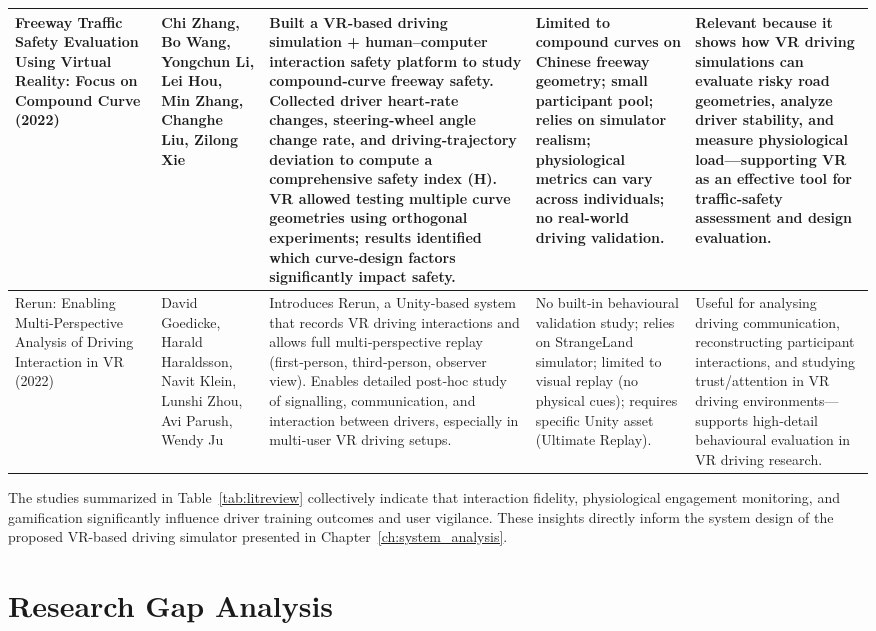 {\begin{longtable}{|p{}|p{}|>{\raggedright\arraybackslash}p{}|>{\raggedright\arraybackslash}p{}|>{\raggedright\arraybackslash}p{}|}
Freeway Traffic Safety Evaluation Using Virtual Reality: Focus on Compound Curve (2022)~\cite{Zhang2022} & Chi Zhang, Bo Wang, Yongchun Li, Lei Hou, Min Zhang, Changhe Liu, Zilong Xie & Built a VR‑based driving simulation + human–computer interaction safety platform to study compound‑curve freeway safety. Collected driver heart‑rate changes, steering‑wheel angle change rate, and driving‑trajectory deviation to compute a comprehensive safety index (H). VR allowed testing multiple curve geometries using orthogonal experiments; results identified which curve‑design factors significantly impact safety. & Limited to compound curves on Chinese freeway geometry; small participant pool; relies on simulator realism; physiological metrics can vary across individuals; no real‑world driving validation. & Relevant because it shows how VR driving simulations can evaluate risky road geometries, analyze driver stability, and measure physiological load—supporting VR as an effective tool for traffic‑safety assessment and design evaluation. \\ \hline
Rerun: Enabling Multi‑Perspective Analysis of Driving Interaction in VR (2022)~\cite{Goedicke2022} & David Goedicke, Harald Haraldsson, Navit Klein, Lunshi Zhou, Avi Parush, Wendy Ju & Introduces Rerun, a Unity‑based system that records VR driving interactions and allows full multi‑perspective replay (first‑person, third‑person, observer view). Enables detailed post‑hoc study of signalling, communication, and interaction between drivers, especially in multi‑user VR driving setups. & No built‑in behavioural validation study; relies on StrangeLand simulator; limited to visual replay (no physical cues); requires specific Unity asset (Ultimate Replay). & Useful for analysing driving communication, reconstructing participant interactions, and studying trust/attention in VR driving environments—supports high‑detail behavioural evaluation in VR driving research. \\ \hline
\end{longtable}}

\noindent The studies summarized in Table~\ref{tab:litreview} collectively indicate that interaction fidelity, physiological engagement monitoring, and gamification significantly influence driver training outcomes and user vigilance. These insights directly inform the system design of the proposed VR-based driving simulator presented in Chapter~\ref{ch:system_analysis}.

\section{Research Gap Analysis}\label{sec:gap_analysis}

